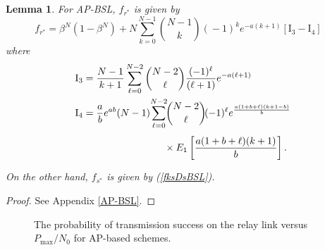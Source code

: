 \documentclass[journal,twocolumn]{IEEEtran}
\newtheorem{lemma}[theorem]{Lemma}
\begin{document}
\begin{lemma}\label{lemma4}
For AP-BSL, $f_{r^*}$ is given by
\begin{equation}\label{fkpDpAPBSL}
f_{r^*}\!\!=\!\!\beta^N\!(1\!-\!\beta^N\!)\!+ 
N \!\!\displaystyle \sum_{k=0}^{N-1}\!\! {\!N\!-\!1 \choose k\!} \!(\!-1\!)^{k} e^{-a(k+1)}\! 
\left[ \mathrm{I}_{3}\! -\! \mathrm{I}_{4} \right] \quad
\end{equation}
where
\begin{align}
& \mathrm{I}_{3}=\frac{N-1}{k+1} \displaystyle \sum_{\ell=0}^{N-2} {N-2 \choose \ell} 
\frac{(-1)^{\ell} }{{(\ell + 1})}  e^{-a(\ell+1)}  \label{I} \\ 
& 
\mathrm{I}_{4}= 
\frac{a}{b}e^{ab}(N-1)\! 
\displaystyle \sum_{\ell=0}^{N-2} \!\!{N-2 \choose \ell}\! (-1)^{\ell}
e^{\frac{a(1+b+\ell)(k+1-b)}{b}} \notag \\
& \phantom{= \frac{a}{b}e^{ab}(N-1)\! \displaystyle \sum_{\ell=0}^{N-2} x}
\times E_{1} \left[ \frac{a(1+b+\ell)(k+1)}{b} \right]. \label{II}
\end{align}
On the other hand, $f_{s^*}$ is given by (\ref{fksDsBSL}).
\end{lemma}
\begin{proof}
See Appendix \ref{AP-BSL}.
\end{proof}




\begin{figure*}[t]
 \centering
 \caption{The probability of transmission success on the relay link versus $P_{\mathrm{max}}/N_{0}$ for AP-based schemes.}
 \label{fr_sim_theo}
  \vspace{-3mm}
\end{figure*}
\end{document}
